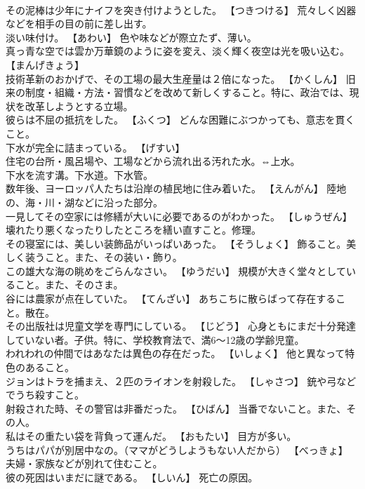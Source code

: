 \documentclass[8pt]{extreport}
\begin{document}
\begin{CJK}{UTF8}{min}
\\	その泥棒は少年にナイフを突き付けようとした。	【つきつける】 荒々しく凶器などを相手の目の前に差し出す。
\\	淡い味付け。	【あわい】 色や味などが際立たず、薄い。
\\	真っ青な空では雲か万華鏡のように姿を変え、淡く輝く夜空は光を吸い込む。	【まんげきょう】 
\\	技術革新のおかげで、その工場の最大生産量は２倍になった。	【かくしん】 旧来の制度・組織・方法・習慣などを改めて新しくすること。特に、政治では、現状を改革しようとする立場。
\\	彼らは不屈の抵抗をした。	【ふくつ】 どんな困難にぶつかっても、意志を貫くこと。
\\	下水が完全に詰まっている。	【げすい】 
\\	住宅の台所・風呂場や、工場などから流れ出る汚れた水。⇔上水。 
\\	下水を流す溝。下水道。下水管。
\\	数年後、ヨーロッパ人たちは沿岸の植民地に住み着いた。	【えんがん】 陸地の、海・川・湖などに沿った部分。
\\	一見してその空家には修繕が大いに必要であるのがわかった。	【しゅうぜん】 壊れたり悪くなったりしたところを繕い直すこと。修理。
\\	その寝室には、美しい装飾品がいっぱいあった。	【そうしょく】 飾ること。美しく装うこと。また、その装い・飾り。
\\	この雄大な海の眺めをごらんなさい。	【ゆうだい】 規模が大きく堂々としていること。また、そのさま。
\\	谷には農家が点在していた。	【てんざい】 あちこちに散らばって存在すること。散在。
\\	その出版社は児童文学を専門にしている。	【じどう】 心身ともにまだ十分発達していない者。子供。特に、学校教育法で、満6～12歳の学齢児童。
\\	われわれの仲間ではあなたは異色の存在だった。	【いしょく】 他と異なって特色のあること。
\\	ジョンはトラを捕まえ、２匹のライオンを射殺した。	【しゃさつ】 銃や弓などでうち殺すこと。
\\	射殺された時、その警官は非番だった。	【ひばん】 当番でないこと。また、その人。
\\	私はその重たい袋を背負って運んだ。	【おもたい】 目方が多い。
\\	うちはパパが別居中なの。（ママがどうしようもない人だから）	【べっきょ】 夫婦・家族などが別れて住むこと。
\\	彼の死因はいまだに謎である。	【しいん】 死亡の原因。

\end{CJK}
\end{document}
